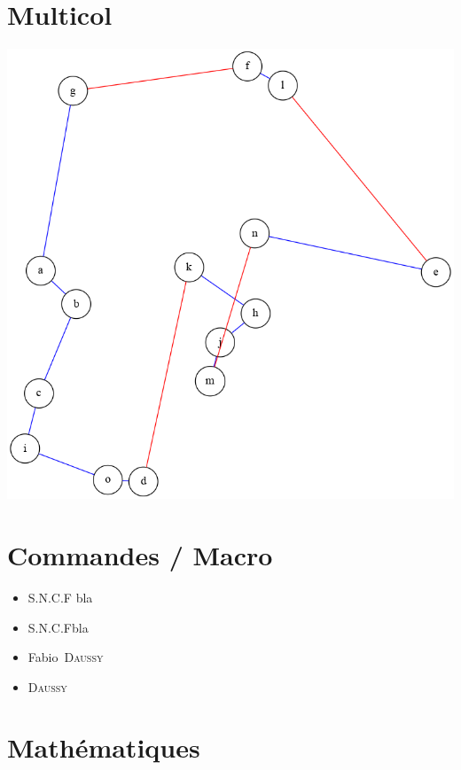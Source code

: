 \documentclass[12pt,a4paper]{scrartcl}
\newcommand{\SNCF}{S.N.C.F}
\newcommand{\nompropre}[2]{#1~\textsc{#2}\xspace}
\newcommand{\nom}[2]{\textsc{#2}\xspace}
\theoremstyle{plain}
\begin{document}
\section{Multicol}

\begin{multicols}{2}

\lipsum[3]

\columnbreak

\includegraphics[scale=0.3]{tsp}
 
\end{multicols}

\section{Commandes / Macro}

\begin{itemize}
	
	\item \SNCF{} bla
	\item \SNCF bla
	\item \nompropre{Fabio}{Daussy}
	\item \nom{Fabio}{Daussy}	
	
\end{itemize}

\section{Mathématiques}
\end{document}
